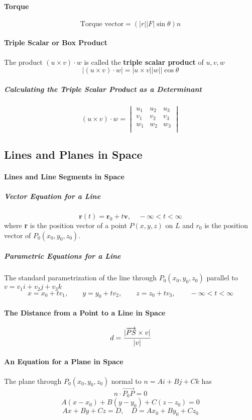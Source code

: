 \documentclass{article}
\begin{document}
            \paragraph{Torque}
                \[\text{Torque vector}=(|r||F|\sin \theta)n\]
            \paragraph{Triple Scalar or Box Product}
                The product $(u\times v)\cdot w$ is called the \textbf{triple scalar product} of $u,v,w$
                \[|(u\times v)\cdot w|=|u\times v||w||\cos\theta\]
                \subparagraph{Calculating the Triple Scalar Product as a Determinant}
                    \[(u\times v)\cdot w=
                    \begin{vmatrix}
                        u_1&u_2&u_3\\
                        v_1&v_2&v_3\\
                        w_1&w_2&w_3\\
                    \end{vmatrix}\]
        \subsection{Lines and Planes in Space}
            \paragraph{Lines and Line Segments in Space}
                \subparagraph{Vector Equation for a Line}
                \[\textbf{r}(t)=\textbf{r}_0+t\textbf{v},\quad -\infty<t<\infty\]
                where \textbf{r} is the position vector of a point $P(x,y,z)$ on $L$ and $r_0$ is the position vector of $P_0(x_0,y_0,z_0)$.
                \subparagraph{Parametric Equations for a Line}
                The standard parametrization of the line through $P_0(x_0,y_0,z_0)$ parallel to $v=v_1 i+v_2j+v_3k$
                    \[x=x_0+tv_1,\qquad y=y_0+tv_2,\qquad z=z_0+tv_3,\qquad -\infty<t<\infty\]
            \paragraph{The Distance from a Point to a Line in Space}
                \[d=\cfrac{|\overrightarrow{PS}\times v|}{|v|}\]
            \paragraph{An Equation for a Plane in Space}
                The plane through $P_0(x_0,y_0,z_0)$ normal to $n=Ai+Bj+Ck$ has
                \[n\cdot \overrightarrow{P_0P}=0\]
                \[A(x-x_0)+B(y-y_0)+C(z-z_0)=0\]
                \[Ax+By+Cz=D,\quad D=Ax_0+By_0+Cz_0\]
\end{document}
